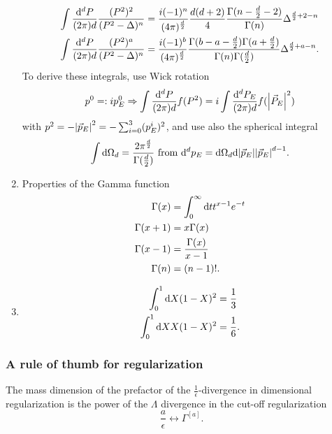 \begin{enumerate}
\begin{align}
		\int \frac{\mathrm{d}^dP}{(2\pi) d} \frac{(P^2)^2}{(P^2-\Delta)^n} &= \frac{i(-1)^n}{(4 \pi)^{\frac{d}{2}}} \frac{d(d+2)}{4} \frac{\Gamma(n-\frac{d}{2} -2)}{\Gamma(n)} \Delta^{\frac{d}{2}+2-n} \\
		\int \frac{\mathrm{d}^dP}{(2\pi) d} \frac{(P^2)^a}{(P^2-\Delta)^n} &= \frac{i(-1)^b}{(4 \pi)^\frac{d}{2}} \frac{\Gamma(b-a-\frac{d}{2}) \Gamma(a+\frac{d}{2})}{\Gamma(n) \Gamma(\frac{d}{2})} \Delta^{\frac{d}{2}+a-n}.
	\end{align}
To derive these integrals, use Wick rotation
\begin{equation}
	p^0 =: i p^0_E \Rightarrow \int \frac{\mathrm{d}^dP}{(2\pi) d} f(P^2) = i \int \frac{\mathrm{d}^dP_E}{(2\pi) d} f(\abs{\vec{P}_E}^2)
\end{equation}
with $p^2=-\abs{\vec{p}_E}^2=-\sum_{i=0}^{3} (p^i_E)^2$, and use also the spherical integral
\begin{equation}
	\int \mathrm{d} \Omega_d = \frac{2 \pi^\frac{d}{2}}{\Gamma(\frac{d}{2})} \text{ from } \mathrm{d}^d p_E = \mathrm{d} \Omega_d \mathrm{d} \abs{\vec{p}_E} \abs{\vec{p}_E}^{d-1}.
\end{equation}
\item Properties of the Gamma function
\begin{align}
	\Gamma(x) &= \int_0^\infty \mathrm{d} t t^{x-1} e^{-t} \\
	\Gamma(x+1) &= x \Gamma(x) \\
	\Gamma(x-1) &= \frac{\Gamma(x)}{x-1}\\
	\Gamma(n) &= (n-1)!.
\end{align}
\item 
\begin{align}
	\int_0^1 \mathrm{d} X (1-X)^2 &=\frac{1}{3} \\
	\int_0^1 \mathrm{d} X X(1-X)^2 &=\frac{1}{6}.
\end{align}
\end{enumerate}
\subsubsection{A rule of thumb for regularization}
The mass dimension of the prefactor of the $\frac{1}{\epsilon}$-divergence in dimensional regularization is the power of the  $\Lambda$ divergence in the cut-off regularization
\begin{equation}
\frac{a}{\epsilon} \leftrightarrow \Gamma^{[a]}.
\end{equation}

